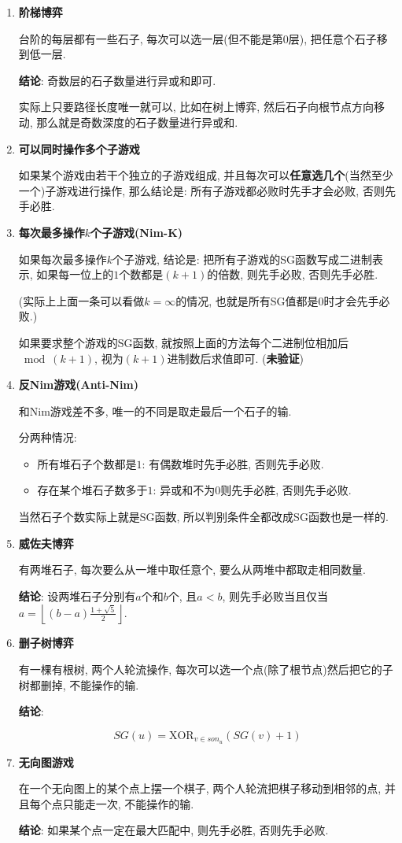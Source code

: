 \begin{enumerate}

\item \textbf{阶梯博弈}

台阶的每层都有一些石子, 每次可以选一层(但不能是第$0$层), 把任意个石子移到低一层.

\textbf{结论}: 奇数层的石子数量进行异或和即可.

实际上只要路径长度唯一就可以, 比如在树上博弈, 然后石子向根节点方向移动, 那么就是奇数深度的石子数量进行异或和.

\item \textbf{可以同时操作多个子游戏}

如果某个游戏由若干个独立的子游戏组成, 并且每次可以\textbf{任意选几个}(当然至少一个)子游戏进行操作, 那么结论是: 所有子游戏都必败时先手才会必败, 否则先手必胜.

\item \textbf{每次最多操作$k$个子游戏(Nim-K)}

如果每次最多操作$k$个子游戏, 结论是: 把所有子游戏的SG函数写成二进制表示, 如果每一位上的$1$个数都是$(k+1)$的倍数, 则先手必败, 否则先手必胜.

(实际上上面一条可以看做$k=\infty$的情况, 也就是所有SG值都是$0$时才会先手必败.)

如果要求整个游戏的SG函数, 就按照上面的方法每个二进制位相加后$\bmod (k+1)$, 视为$(k+1)$进制数后求值即可. (\textbf{未验证})

\item \textbf{反Nim游戏(Anti-Nim)}

和Nim游戏差不多, 唯一的不同是取走最后一个石子的输.

分两种情况:

\begin{itemize}
	\item 所有堆石子个数都是$1$: 有偶数堆时先手必胜, 否则先手必败.
	\item 存在某个堆石子数多于$1$: 异或和不为$0$则先手必胜, 否则先手必败.
\end{itemize}

当然石子个数实际上就是SG函数, 所以判别条件全都改成SG函数也是一样的.

\item \textbf{威佐夫博弈}

有两堆石子, 每次要么从一堆中取任意个, 要么从两堆中都取走相同数量.

\textbf{结论}: 设两堆石子分别有$a$个和$b$个, 且$a<b$, 则先手必败当且仅当$a = \left\lfloor (b-a)\frac {1 + \sqrt 5} 2 \right\rfloor$.

\item \textbf{删子树博弈}

有一棵有根树, 两个人轮流操作, 每次可以选一个点(除了根节点)然后把它的子树都删掉, 不能操作的输.

\textbf{结论}:

$$ SG(u) = \text{XOR} _{v \in son_u} \left( SG(v) + 1 \right) $$

\item \textbf{无向图游戏}

在一个无向图上的某个点上摆一个棋子, 两个人轮流把棋子移动到相邻的点, 并且每个点只能走一次, 不能操作的输.

\textbf{结论}: 如果某个点一定在最大匹配中, 则先手必胜, 否则先手必败.

\end{enumerate}